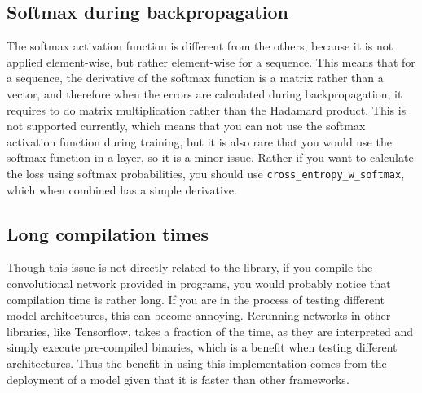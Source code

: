 {	\subsection{Softmax during backpropagation}
	The softmax activation function is different from the others, because it is not
	applied element-wise, but rather element-wise for a sequence. 
	This means that for a sequence, the derivative of the softmax function is a
	matrix rather than a vector, and therefore when the errors are calculated during
	backpropagation, it requires to do matrix multiplication rather than the
	Hadamard product. 
	This is not supported currently, which means that you can not use the softmax
	activation function during training, but it is also rare that you would use the
	softmax function in a layer, so it is a minor issue. 
	Rather if you want to calculate the loss using softmax probabilities, you should
	use \texttt{cross\_entropy\_w\_softmax}, which when combined has a simple
	derivative. 
	
	\subsection{Long compilation times}
	Though this issue is not directly related to the library, if you compile the
	convolutional network provided in programs, you would probably notice that
	compilation time is rather long. If you are in the process of testing different
	model architectures, this can become annoying. 
	Rerunning networks in other libraries, like Tensorflow, takes a fraction of the
	time, as they are interpreted and simply execute pre-compiled binaries, which is
	a benefit when testing different architectures. 
	Thus the benefit in using this implementation comes from the deployment of a
	model given that it is faster than other frameworks.
}

